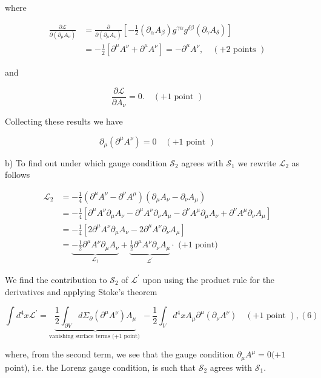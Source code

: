\documentclass[10pt, letterpaper]{article}
\begin{document}
where

$$
\begin{aligned}
\frac{\partial \mathcal{L}}{\partial\left(\partial_\mu A_\nu\right)} & =\frac{\partial}{\partial\left(\partial_\mu A_\nu\right)}\left[-\frac{1}{2}\left(\partial_\alpha A_\beta\right) g^{\gamma \alpha} g^{\delta \beta}\left(\partial_\gamma A_\delta\right)\right] \\
& =-\frac{1}{2}\left[\partial^\mu A^\nu+\partial^\mu A^\nu\right]=-\partial^\mu A^\nu, \quad(+2 \text { points })
\end{aligned}
$$

and

$$
\frac{\partial \mathcal{L}}{\partial A_\nu}=0 . \quad(+1 \text { point })
$$


Collecting these results we have

$$
\partial_\mu\left(\partial^\mu A^\nu\right)=0 \quad(+1 \text { point })
$$

b) To find out under which gauge condition $\mathcal{S}_2$ agrees with $\mathcal{S}_1$ we rewrite $\mathcal{L}_2$ as follows

$$
\begin{aligned}
\mathcal{L}_2 & =-\frac{1}{4}\left(\partial^\mu A^\nu-\partial^\nu A^\mu\right)\left(\partial_\mu A_\nu-\partial_\nu A_\mu\right) \\
& =-\frac{1}{4}\left[\partial^\mu A^\nu \partial_\mu A_\nu-\partial^\mu A^\nu \partial_\nu A_\mu-\partial^\nu A^\mu \partial_\mu A_\nu+\partial^\nu A^\mu \partial_\nu A_\mu\right] \\
& =-\frac{1}{4}\left[2 \partial^\mu A^\nu \partial_\mu A_\nu-2 \partial^\mu A^\nu \partial_\nu A_\mu\right] \\
& =\underbrace{-\frac{1}{2} \partial^\mu A^\nu \partial_\mu A_\nu}_{\mathcal{L}_1}+\underbrace{\frac{1}{2} \partial^\mu A^\nu \partial_\nu A_\mu}_{\mathcal{L}^{\prime}} \cdot \text { (+1 point) }
\end{aligned}
$$


We find the contribution to $\mathcal{S}_2$ of $\mathcal{L}^{\prime}$ upon using the product rule for the derivatives and applying Stoke's theorem

$$
\int d^4 x \mathcal{L}^{\prime}=\underbrace{\frac{1}{2} \int_{\partial V} d \Sigma_{\partial}\left(\partial^\mu A^\nu\right) A_\mu}_{\text {vanishing surface terms (+1 point) }}-\frac{1}{2} \int_V d^4 x A_\mu \partial^\mu\left(\partial_\nu A^\nu\right) \quad(+1 \text { point }),(6)
$$

where, from the second term, we see that the gauge condition $\partial_\mu A^\mu=0(+1$ point), i.e. the Lorenz gauge condition, is such that $\mathcal{S}_2$ agrees with $\mathcal{S}_1$.
\end{document}
